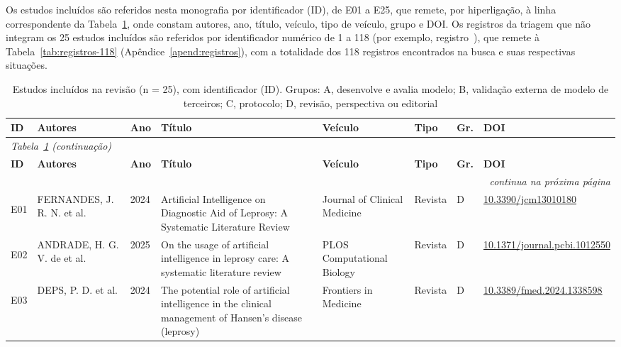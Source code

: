 Os estudos incluídos são referidos nesta monografia por identificador (ID), de E01 a E25, que remete, por hiperligação, à linha correspondente da Tabela~\ref{tab:estudos-incluidos}, onde constam autores, ano, título, veículo, tipo de veículo, grupo e DOI. Os registros da triagem que não integram os 25 estudos incluídos são referidos por identificador numérico de 1 a 118 (por exemplo, registro~), que remete à Tabela~\ref{tab:registros-118} (Apêndice~\ref{apend:registros}), com a totalidade dos 118 registros encontrados na busca e suas respectivas situações.

\begingroup
\scriptsize
\setlength{\tabcolsep}{2.5pt}
\renewcommand{\arraystretch}{1.1}
\begin{longtable}{@{}lp{2.7cm}lp{3.6cm}p{2.7cm}llp{2.1cm}@{}}
\caption[Estudos inclu\'idos na revis\~ao, com identificador (ID)]{Estudos inclu\'idos na revis\~ao (n = 25), com identificador (ID). Grupos: A, desenvolve e avalia modelo; B, valida\c{c}\~ao externa de modelo de terceiros; C, protocolo; D, revis\~ao, perspectiva ou editorial}\label{tab:estudos-incluidos}\\
\toprule
\textbf{ID} & \textbf{Autores} & \textbf{Ano} & \textbf{T\'itulo} & \textbf{Ve\'iculo} & \textbf{Tipo} & \textbf{Gr.} & \textbf{DOI} \\
\midrule
\endfirsthead
\multicolumn{8}{l}{\scriptsize\textit{Tabela~\ref{tab:estudos-incluidos} (continua\c{c}\~ao)}}\\
\toprule
\textbf{ID} & \textbf{Autores} & \textbf{Ano} & \textbf{T\'itulo} & \textbf{Ve\'iculo} & \textbf{Tipo} & \textbf{Gr.} & \textbf{DOI} \\
\midrule
\endhead
\midrule
\multicolumn{8}{r}{\scriptsize\textit{continua na pr\'oxima p\'agina}}\\
\endfoot
\bottomrule
\endlastfoot
\hypertarget{estudo:E01}{}E01 & FERNANDES, J. R. N. et al. & 2024 & Artificial Intelligence on Diagnostic Aid of Leprosy: A Systematic Literature Review & Journal of Clinical Medicine & Revista & D & \href{https://doi.org/10.3390/jcm13010180}{10.\allowbreak{}3390/\allowbreak{}jcm13010180} \\
\hypertarget{estudo:E02}{}E02 & ANDRADE, H. G. V. de et al. & 2025 & On the usage of artificial intelligence in leprosy care: A systematic literature review & PLOS Computational Biology & Revista & D & \href{https://doi.org/10.1371/journal.pcbi.1012550}{10.\allowbreak{}1371/\allowbreak{}journal.\allowbreak{}pcbi.\allowbreak{}1012550} \\
\hypertarget{estudo:E03}{}E03 & DEPS, P. D. et al. & 2024 & The potential role of artificial intelligence in the clinical management of Hansen's disease (leprosy) & Frontiers in Medicine & Revista & D & \href{https://doi.org/10.3389/fmed.2024.1338598}{10.\allowbreak{}3389/\allowbreak{}fmed.\allowbreak{}2024.\allowbreak{}1338598} \\

\end{longtable}
